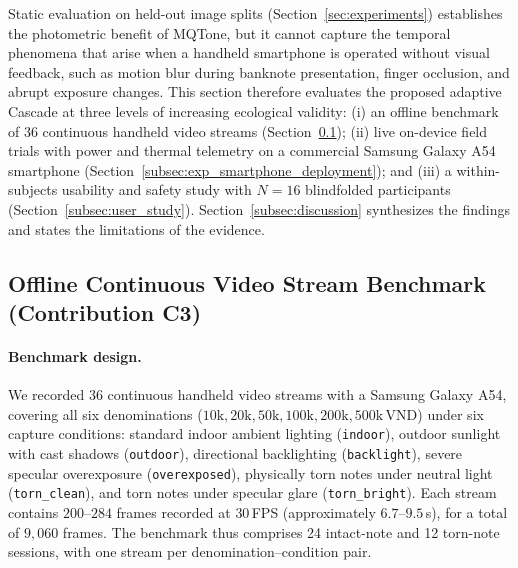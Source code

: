 \documentclass[final,5p,times,twocolumn,authoryear]{elsarticle}
\begin{document}
Static evaluation on held-out image splits (Section~\ref{sec:experiments}) establishes the photometric benefit of MQTone, but it cannot capture the temporal phenomena that arise when a handheld smartphone is operated without visual feedback, such as motion blur during banknote presentation, finger occlusion, and abrupt exposure changes. This section therefore evaluates the proposed adaptive Cascade at three levels of increasing ecological validity: (i) an offline benchmark of 36 continuous handheld video streams (Section~\ref{subsec:exp_c3_video_benchmark}); (ii) live on-device field trials with power and thermal telemetry on a commercial Samsung Galaxy A54 smartphone (Section~\ref{subsec:exp_smartphone_deployment}); and (iii) a within-subjects usability and safety study with $N=16$ blindfolded participants (Section~\ref{subsec:user_study}). Section~\ref{subsec:discussion} synthesizes the findings and states the limitations of the evidence.

\subsection{Offline Continuous Video Stream Benchmark (Contribution C3)}
\label{subsec:exp_c3_video_benchmark}

\paragraph{Benchmark design.}
We recorded 36 continuous handheld video streams with a Samsung Galaxy A54, covering all six denominations ($10\text{k}, 20\text{k}, 50\text{k}, 100\text{k}, 200\text{k}, 500\text{k}$\,VND) under six capture conditions: standard indoor ambient lighting (\texttt{indoor}), outdoor sunlight with cast shadows (\texttt{outdoor}), directional backlighting (\texttt{backlight}), severe specular overexposure (\texttt{overexposed}), physically torn notes under neutral light (\texttt{torn\_clean}), and torn notes under specular glare (\texttt{torn\_bright}). Each stream contains $200$--$284$ frames recorded at $30$\,FPS (approximately $6.7$--$9.5$\,s), for a total of $9{,}060$ frames. The benchmark thus comprises 24 intact-note and 12 torn-note sessions, with one stream per denomination--condition pair.
\end{document}
